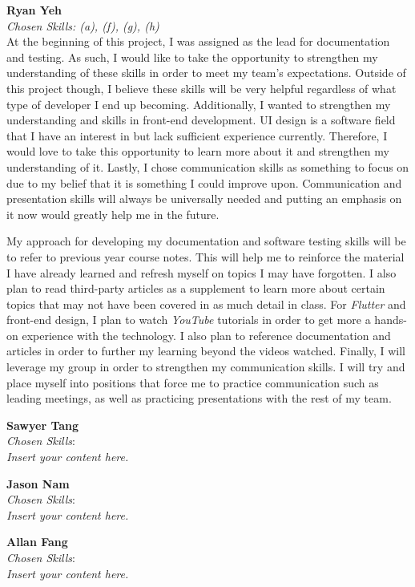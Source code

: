 \documentclass[12pt]{article}
\newcommand{\lips}{\textit{Insert your content here.}}
\begin{document}
\begin{enumerate}
  \textbf{Ryan Yeh}\\
  \textit{Chosen Skills: (a), (f), (g), (h)} \\
  At the beginning of this project, I was assigned as the lead for documentation and testing. As such,
  I would like to take the opportunity to strengthen my understanding of these skills in order to meet my team's
  expectations. Outside of this project though, I believe these skills will be very helpful regardless of what type
  of developer I end up becoming. Additionally, I wanted to strengthen my understanding and skills in front-end
  development. UI design is a software field that I have an interest in but lack sufficient experience currently.
  Therefore, I would love to take this opportunity to learn more about it and strengthen my understanding of it. Lastly,
  I chose communication skills as something to focus on due to my belief that it is something I could improve upon.
  Communication and presentation skills will always be universally needed and putting an emphasis on it now would greatly
  help me in the future. \par
  My approach for developing my documentation and software testing skills will be to refer to previous year course notes.
  This will help me to reinforce the material I have already learned and refresh myself on topics I may have forgotten.
  I also plan to read third-party articles as a supplement to learn more about certain
  topics that may not have been covered in as much detail in class. For \textit{Flutter} and front-end design,
  I plan to watch \textit{YouTube} tutorials in order to get more a hands-on experience with the technology. I also
  plan to reference documentation and articles in order to further my learning beyond the videos watched. Finally,
  I will leverage my group in order to strengthen my communication skills. I will try and place myself into positions
  that force me to practice communication such as leading meetings, as well as practicing presentations with the
  rest of my team.

  \medskip
  \textbf{Sawyer Tang}\\
  \textit{Chosen Skills}: \\
  \lips

  \medskip
  \textbf{Jason Nam}\\
  \textit{Chosen Skills}: \\
  \lips

  \medskip
  \textbf{Allan Fang}\\
  \textit{Chosen Skills}: \\
  \lips

\end{enumerate}
\end{document}
